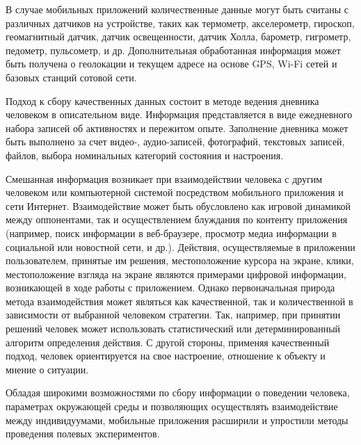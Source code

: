 В случае мобильных приложений количественные данные могут быть считаны с различных датчиков на устройстве, таких как термометр, акселерометр, гироскоп, геомагнитный датчик, датчик освещенности, датчик Холла, барометр, гигрометр, педометр, пульсометр, и др. Дополнительная обработанная информация может быть получена о геолокации и текущем адресе на основе GPS, Wi-Fi сетей и базовых станций сотовой сети.

Подход к сбору качественных данных состоит в методе ведения дневника человеком в описательном виде. Информация представляется в виде ежедневного набора записей об активностях и пережитом опыте. Заполнение дневника может быть выполнено за счет видео-, аудио-записей, фотографий, текстовых записей, файлов, выбора номинальных категорий состояния и настроения.

Смешанная информация возникает при взаимодействии человека с другим человеком или компьютерной системой посредством мобильного приложения и сети Интернет. Взаимодействие может быть обусловлено как игровой динамикой между оппонентами, так и осуществлением блуждания по контенту приложения (например, поиск информации в веб-браузере, просмотр медиа информации в социальной или новостной сети, и др.). Действия, осуществляемые в приложении пользователем, принятые им решения, местоположение курсора на экране, клики, местоположение взгляда на экране являются примерами цифровой информации, возникающей в ходе работы с приложением. Однако первоначальная природа метода взаимодействия может являться как качественной, так и количественной в зависимости от выбранной человеком стратегии. Так, например, при принятии решений человек может использовать статистический или детерминированный алгоритм определения действия. С другой стороны, применяя качественный подход, человек ориентируется на свое настроение, отношение к объекту и мнение о ситуации.

Обладая широкими возможностями по сбору информации о поведении человека, параметрах окружающей среды и позволяющих осуществлять взаимодействие между индивидуумами, мобильные приложения расширили и упростили методы проведения полевых экспериментов.




